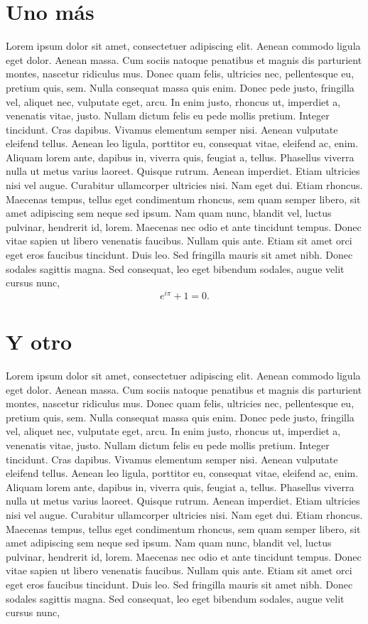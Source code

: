 \documentclass[a4paper,11pt,spanish, twoside, leqno]{tfg-uam}
\theoremstyle{definition}
\begin{document}
\section{Uno m\'as}

Lorem ipsum dolor sit amet, consectetuer adipiscing elit. Aenean commodo ligula eget dolor. Aenean massa. Cum sociis natoque penatibus et magnis dis parturient montes, nascetur ridiculus mus. Donec quam felis, ultricies nec, pellentesque eu, pretium quis, sem. Nulla consequat massa quis enim. Donec pede justo, fringilla vel, aliquet nec, vulputate eget, arcu. In enim justo, rhoncus ut, imperdiet a, venenatis vitae, justo. Nullam dictum felis eu pede mollis pretium. Integer tincidunt. Cras dapibus. Vivamus elementum semper nisi. Aenean vulputate eleifend tellus. Aenean leo ligula, porttitor eu, consequat vitae, eleifend ac, enim. Aliquam lorem ante, dapibus in, viverra quis, feugiat a, tellus. Phasellus viverra nulla ut metus varius laoreet. Quisque rutrum. Aenean imperdiet. Etiam ultricies nisi vel augue. Curabitur ullamcorper ultricies nisi. Nam eget dui. Etiam rhoncus. Maecenas tempus, tellus eget condimentum rhoncus, sem quam semper libero, sit amet adipiscing sem neque sed ipsum. Nam quam nunc, blandit vel, luctus pulvinar, hendrerit id, lorem. Maecenas nec odio et ante tincidunt tempus. Donec vitae sapien ut libero venenatis faucibus. Nullam quis ante. Etiam sit amet orci eget eros faucibus tincidunt. Duis leo. Sed fringilla mauris sit amet nibh. Donec sodales sagittis magna. Sed consequat, leo eget bibendum sodales, augue velit cursus nunc,
$$
e^{i\pi }+1=0.
$$

\section{Y otro}

Lorem ipsum dolor sit amet, consectetuer adipiscing elit. Aenean commodo ligula eget dolor. Aenean massa. Cum sociis natoque penatibus et magnis dis parturient montes, nascetur ridiculus mus. Donec quam felis, ultricies nec, pellentesque eu, pretium quis, sem. Nulla consequat massa quis enim. Donec pede justo, fringilla vel, aliquet nec, vulputate eget, arcu. In enim justo, rhoncus ut, imperdiet a, venenatis vitae, justo. Nullam dictum felis eu pede mollis pretium. Integer tincidunt. Cras dapibus. Vivamus elementum semper nisi. Aenean vulputate eleifend tellus. Aenean leo ligula, porttitor eu, consequat vitae, eleifend ac, enim. Aliquam lorem ante, dapibus in, viverra quis, feugiat a, tellus. Phasellus viverra nulla ut metus varius laoreet. Quisque rutrum. Aenean imperdiet. Etiam ultricies nisi vel augue. Curabitur ullamcorper ultricies nisi. Nam eget dui. Etiam rhoncus. Maecenas tempus, tellus eget condimentum rhoncus, sem quam semper libero, sit amet adipiscing sem neque sed ipsum. Nam quam nunc, blandit vel, luctus pulvinar, hendrerit id, lorem. Maecenas nec odio et ante tincidunt tempus. Donec vitae sapien ut libero venenatis faucibus. Nullam quis ante. Etiam sit amet orci eget eros faucibus tincidunt. Duis leo. Sed fringilla mauris sit amet nibh. Donec sodales sagittis magna. Sed consequat, leo eget bibendum sodales, augue velit cursus nunc,
\end{document}
